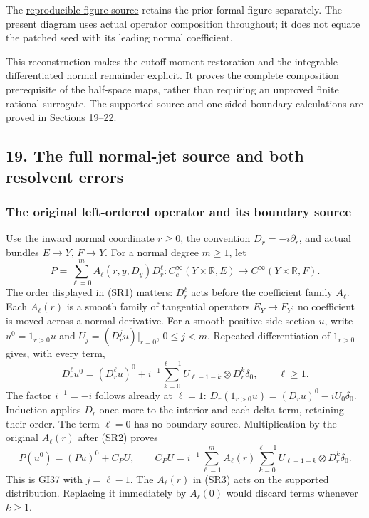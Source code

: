 \documentclass[
  11pt,
]{article}
\makeatletter
\let\ReaderOriginalAnchorStart\hyper@anchorstart
\let\ReaderOriginalAnchorEnd\hyper@anchorend
\let\ReaderPendingAliases\@empty
\def\ReaderArmAliases#1{\gdef\ReaderPendingAliases{#1}}
\def\hyper@anchorstart#1{\ReaderIfNativeAnchorTF{#1}{\ReaderPendingAliases\global\let\ReaderPendingAliases\@empty}{}\ReaderOriginalAnchorStart{#1}}
\makeatother
\begin{document}
The \href{../figures/normal_composition_actual_166.py}{reproducible
figure source} retains the prior formal figure separately. The present
diagram uses actual operator composition throughout; it does not equate
the patched seed with its leading normal coefficient.

This reconstruction makes the cutoff moment restoration and the
integrable differentiated normal remainder explicit. It proves the
complete composition prerequisite of the half-space maps, rather than
requiring an unproved finite rational surrogate. The supported-source
and one-sided boundary calculations are proved in Sections 19--22.

\ReaderArmAliases{\ReaderOriginalAnchorStart{AN03-GCF-FOUNDATION-019}\ReaderOriginalAnchorEnd\begingroup\expandafter\def\csname @currentHref\endcsname{AN03-GCF-FOUNDATION-019}\label{AN03-GCF-FOUNDATION-019}\endgroup\ReaderOriginalAnchorStart{boundary-foundation-19}\ReaderOriginalAnchorEnd}
\subsection{19. The full normal-jet source and both resolvent
errors}\label{boundary-foundation-19}

\subsubsection{The original left-ordered operator and its boundary
source}\label{the-original-left-ordered-operator-and-its-boundary-source}

Use the inward normal coordinate \(r\geq0\), the convention
\(D_r=-i\partial_r\), and actual bundles \(E\to Y\), \(F\to Y\). For a
normal degree \(m\geq1\), let \[
P=\sum_{\ell=0}^{m}A_\ell(r,y,D_y)D_r^\ell:
 C_c^\infty(Y\times\mathbb R,E)\longrightarrow
 C^\infty(Y\times\mathbb R,F).
\tag{SR1}
\] The order displayed in (SR1) matters: \(D_r^\ell\) acts before the
coefficient family \(A_\ell\). Each \(A_\ell(r)\) is a smooth family of
tangential operators \(E_Y\to F_Y\); no coefficient is moved across a
normal derivative. For a smooth positive-side section \(u\), write
\(u^0=1_{r>0}u\) and \(U_j=(D_r^j u)|_{r=0}\), \(0\leq j<m\). Repeated
differentiation of \(1_{r>0}\) gives, with every term, \[
D_r^\ell u^0=(D_r^\ell u)^0+
 i^{-1}\sum_{k=0}^{\ell-1}
 U_{\ell-1-k}\otimes D_r^k\delta_0,\qquad \ell\geq1.
\tag{SR2}
\] The factor \(i^{-1}=-i\) follows already at \(\ell=1\):
\(D_r(1_{r>0}u)=(D_ru)^0-iU_0\delta_0\). Induction applies \(D_r\) once
more to the interior and each delta term, retaining their order. The
term \(\ell=0\) has no boundary source. Multiplication by the original
\(A_\ell(r)\) after (SR2) proves \[
P(u^0)=(Pu)^0+C_PU,\qquad
C_PU=i^{-1}\sum_{\ell=1}^{m}
 A_\ell(r)\sum_{k=0}^{\ell-1}
 U_{\ell-1-k}\otimes D_r^k\delta_0.
\tag{SR3}
\] This is GI37 with \(j=\ell-1\). The \(A_\ell(r)\) in (SR3) acts on
the supported distribution. Replacing it immediately by \(A_\ell(0)\)
would discard terms whenever \(k\geq1\).
\end{document}
